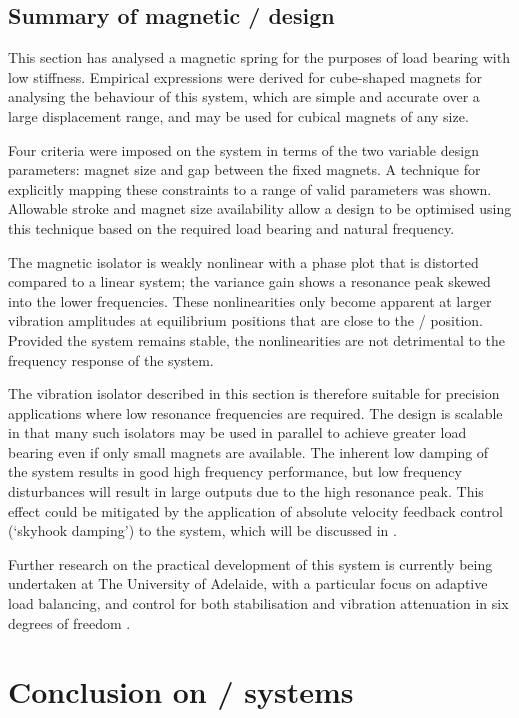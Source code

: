 \documentclass[11pt,a4paper]{memoir}
\begin{document}
\subsection{Summary of magnetic \qzs/ design}

This section has analysed a magnetic spring for the purposes of load bearing with low stiffness.
Empirical expressions were derived for cube-shaped magnets for analysing the behaviour of this system, which are simple and accurate over a large displacement range, and may be used for cubical magnets of any size.

Four criteria were imposed on the system in terms of the two variable design
parameters: magnet size and gap between the fixed magnets. A technique for explicitly
mapping these constraints to a range of valid parameters was shown. Allowable stroke
and magnet size availability allow a design to be optimised using this technique
based on the required load bearing and natural frequency.

The magnetic isolator is weakly nonlinear with a phase plot that is distorted compared to
a linear system; the variance gain shows a resonance peak skewed into the lower
frequencies. These nonlinearities only become apparent at larger vibration amplitudes
at equilibrium positions that are close to the \qzs/ position.
Provided the system remains stable, the nonlinearities are not detrimental to the frequency response of the system.

The vibration isolator described in this section is therefore suitable for
precision applications where low resonance frequencies are required. The
design is scalable in that many such isolators may be used in parallel to
achieve greater load bearing even if only small magnets are available. The
inherent low damping of the system results in good high frequency performance,
but low frequency disturbances will result in large outputs due to the high
resonance peak. This effect could be mitigated by the application of absolute velocity feedback control (`skyhook damping') to the system, which will be discussed in .

Further research on the practical development of this system is currently being undertaken at The University of Adelaide, with a particular focus on adaptive load balancing, and control for both stabilisation and vibration attenuation in six degrees of freedom \cite{zhu2011-icmt}.

\section{Conclusion on \qzs/ systems}
\end{document}
